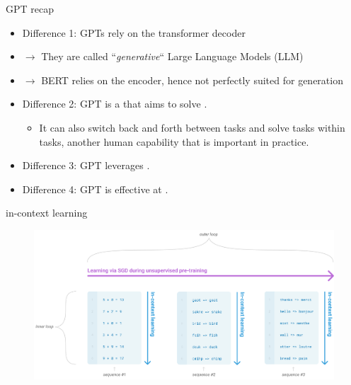 \begin{frame}{GPT recap}

\vfill

  \begin{itemize}
\item Difference 1: GPTs rely on the transformer decoder
\item[] $\to$ They are called ``\textit{generative}`` Large Language Models (LLM)
\item[] $\to$ BERT relies on the encoder, hence not perfectly suited for generation
\item Difference 2: GPT is a  that aims to solve .  
  \begin{itemize}
    \item It can also switch back and forth between tasks and solve
    tasks within tasks, another human capability that is
    important in practice. 
    \end{itemize}
\item Difference 3: GPT leverages .
\item Difference 4: GPT is effective at .
    \end{itemize}

\vfill

\end{frame}


\begin{frame}{in-context learning}

\vfill

\begin{figure}
		\centering
		\includegraphics[clip,trim=200px 0 0 0,width=\linewidth]{figure/twotypesoflearning.png}\\
	\end{figure}

\vfill

\end{frame}

